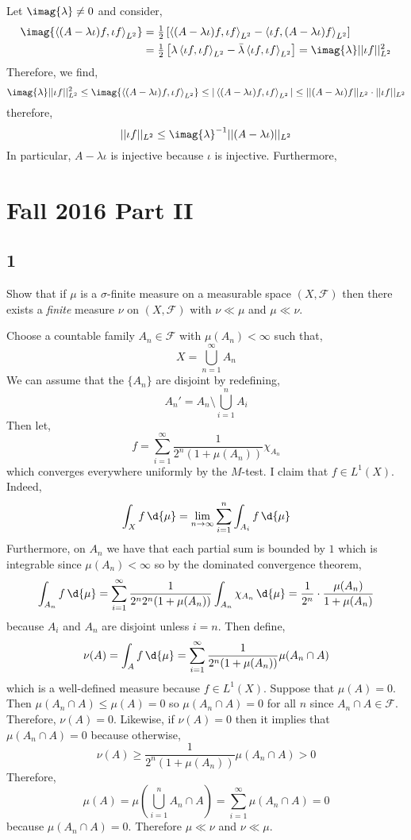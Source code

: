 \documentclass[12pt]{article}
\newcommand{\inner}[2]{\left< #1, #2 \right>}
\renewcommand{\F}{\mathcal{F}}
\begin{document}
Let $\imag{\lambda} \neq 0$ and consider,
\begin{align*}
\imag{\inner{(A - \lambda \iota) f}{\iota f}_{L^2}} & = \tfrac{1}{2} \left[ \inner{(A - \lambda \iota) f}{\iota f}_{L^2} - \inner{\iota f}{(A - \lambda \iota) f}_{L^2} \right]
\\
&  = \tfrac{1}{2} \left[ \lambda \inner{\iota f}{\iota f}_{L^2} - \bar{\lambda} \inner{\iota f}{\iota f}_{L^2} \right] = \imag{\lambda} || \iota f ||_{L^2}^2
\end{align*}
Therefore, we find,
\[ \imag{\lambda} || \iota f ||_{L^2}^2 \le \imag{\inner{(A - \lambda \iota) f}{\iota f}_{L^2}} \le | \inner{(A - \lambda \iota) f}{\iota f}_{L^2} | \le || (A - \lambda \iota) f ||_{L^2} \cdot || \iota f ||_{L^2} \]
therefore,
\[ || \iota f ||_{L^2} \le \imag{\lambda}^{-1} || (A - \lambda \iota) ||_{L^2} \]
In particular, $A - \lambda \iota$ is injective because $\iota$ is injective. Furthermore,

\section{Fall 2016 Part II}

\subsection{1}

\begin{exercise}
Show that if $\mu$ is a $\sigma$-finite measure on a measurable space $(X, \F)$ then there exists a \textit{finite} measure $\nu$ on $(X, \F)$ with $\nu \ll \mu$ and $\mu \ll \nu$.
\end{exercise}

Choose a countable family $A_n \in \F$ with $\mu(A_n) < \infty$ such that,
\[ X = \bigcup_{n = 1}^\infty A_n \]
We can assume that the $\{ A_n \}$ are disjoint by redefining,
\[ A_n' = A_n \setminus \bigcup_{i = 1}^n A_i \]
Then let, 
\[ f = \sum_{i = 1}^\infty \frac{1}{2^n (1 + \mu(A_n))} \chi_{A_n} \]
which converges everywhere uniformly by the $M$-test. I claim that $f \in L^1(X)$. Indeed,
\[ \int_X f \, \d{\mu} = \lim_{n \to \infty} \sum_{i = 1}^n \int_{A_i} f \, \d{\mu} \]
Furthermore, on $A_n$ we have that each partial sum is bounded by $1$ which is integrable since $\mu(A_n) < \infty$ so by the dominated convergence theorem,
\[  \int_{A_n} f \, \d{\mu} = \sum_{i = 1}^\infty \frac{1}{2^n 2^n (1 + \mu(A_n))} \int_{A_n} \chi_{A_n} \, \d{\mu} = \frac{1}{2^n} \cdot \frac{\mu(A_n)}{1 + \mu(A_n)} \]
because $A_i$ and $A_n$ are disjoint unless $i = n$. Then define,
\[ \nu(A) = \int_A f \, \d{\mu} = \sum_{i = 1}^\infty \frac{1}{2^n (1 + \mu(A_n))} \mu(A_n \cap A) \]
which is a well-defined measure because $f \in L^1(X)$. Suppose that $\mu(A) = 0$. Then $\mu(A_n \cap A) \le \mu(A) = 0$ so $\mu(A_n \cap A) = 0$ for all $n$ since $A_n \cap A \in \F$. Therefore, $\nu(A) = 0$. Likewise, if $\nu(A) = 0$ then it implies that $\mu(A_n \cap A) = 0$ because otherwise,
\[ \nu(A) \ge \frac{1}{2^n (1 + \mu(A_n))} \mu(A_n \cap A) > 0 \]
Therefore, 
\[ \mu(A) = \mu \left( \bigcup_{i = 1}^n A_n \cap A \right) = \sum_{i = 1}^\infty \mu(A_n \cap A) = 0 \]
because $\mu(A_n \cap A) = 0$. Therefore $\mu \ll \nu$ and $\nu \ll \mu$.
\end{document}
